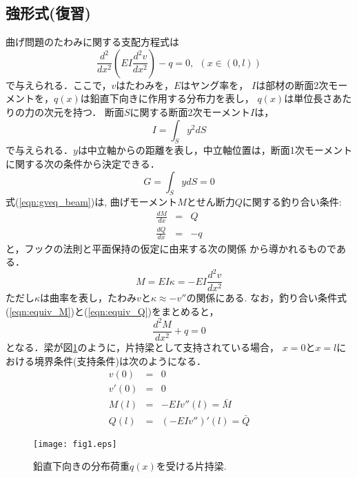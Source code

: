 \documentclass[10pt,a4j]{jarticle}
\begin{document}
\subsection{強形式(復習)}
曲げ問題のたわみに関する支配方程式は
\begin{equation}
	\frac{d^2}{dx^2}\left(EI \frac{d^2v}{dx^2}\right) -q =0, \ \ \left(x\in (0,l)\right)
	\label{eqn:gveq_beam}
\end{equation}
で与えられる．ここで，$v$はたわみを，$E$はヤング率を，
$I$は部材の断面2次モーメントを，$q(x)$は鉛直下向きに作用する分布力を表し，
$q(x)$は単位長さあたりの力の次元を持つ．
断面$S$に関する断面2次モーメント$I$は，
\begin{equation}
	I=\int_S y^2 dS
	\label{eqn:}
\end{equation}
で与えられる．$y$は中立軸からの距離を表し，中立軸位置は，断面1次モーメント
に関する次の条件から決定できる．
\begin{equation}
	G=\int _S ydS=0
	\label{eqn:}
\end{equation}
式(\ref{eqn:gveq_beam})は, 曲げモーメント$M$とせん断力$Q$に関する釣り合い条件:
\begin{eqnarray}
	\frac{dM}{dx} &=& Q
	\label{eqn:equiv_M} \\
	\frac{dQ}{dx} &=& -q
	\label{eqn:equiv_Q}
\end{eqnarray}
と，フックの法則と平面保持の仮定に由来する次の関係
から導かれるものである．
\begin{equation}
	M=EI \kappa= -EI\frac{d^2v}{dx^2}
	\label{eqn:M_k}
\end{equation}
ただし$\kappa$は曲率を表し，たわみ$v$と$\kappa\approx -v''$の関係にある. 
なお，釣り合い条件式(\ref{eqn:equiv_M})と(\ref{eqn:equiv_Q})をまとめると，
\begin{equation}
	\frac{d^2M}{dx^2}+q=0
	\label{eqn:equiv_MQ}
\end{equation}
となる．梁が図\ref{fig:fig2_1}のように，片持梁として支持されている場合，
$x=0$と$x=l$における境界条件(支持条件)は次のようになる．
\begin{eqnarray}
	v (0) &= & 0 
	\label{eqn:BC_v}
	\\
	v' (0) &= & 0 
	\label{eqn:BC_th}
	\\
	M (l) &= & -EI v''(l)=\bar M 
	\label{eqn:BC_M} \\
	Q (l) &= & \left(-EI v''\right)'(l)=\bar Q 
	\label{eqn:BC_Q} 
\end{eqnarray}
\begin{figure}[h]
	\begin{center}
	\texttt{[image: fig1.eps]} 
	\end{center}
	\caption{鉛直下向きの分布荷重$q(x)$を受ける片持梁.} 
	\label{fig:fig2_1}
\end{figure}
\end{document}
